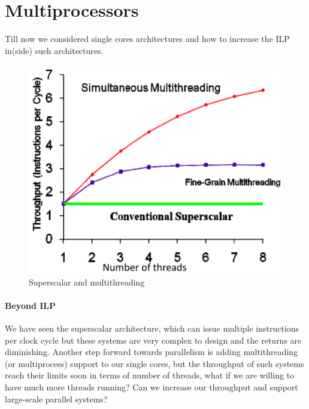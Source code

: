 
\section{Multiprocessors}\label{sec:multiprocessors}
Till now we considered single cores architectures and how to increase the ILP in(side) such architectures.

\begin{figure}[h]
    \centering
    \includegraphics[scale = 0.4]{images/superscalar-vs-multithreading}
    \caption{Superscalar and multithreading}
    \label{fig:superscalar-and-multithreading}
\end{figure}

\paragraph{Beyond ILP}
We have seen the superscalar architecture, which can issue multiple instructions per clock cycle but these systems are
very complex to design and the returns are diminishing.
Another step forward towards parallelism is adding multithreading (or multiprocess) support to our single cores, but
the throughput of such systems reach their limits soon in terms of number of threads, what if we are willing to
have much more threads running?
Can we increase our throughput and support large-scale parallel systems?

